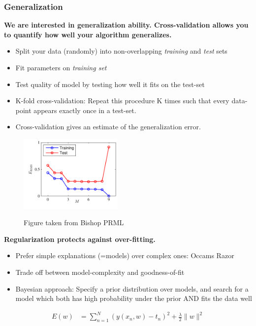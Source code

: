 \subsubsection{Generalization}
\textbf{We are interested in generalization ability. Cross-validation allows you to
quantify how well your algorithm generalizes.}\\
\begin{itemize}
	\item Split your data (randomly) into non-overlapping \textit{training} and \textit{test} sets
    \item Fit parameters on \textit{training set}
    \item Test quality of model by testing how well it fits on the test-set
    \item K-fold cross-validation: Repeat this procedure K times such that every data-point appears exactly once in a test-set.
    \item Cross-validation gives an estimate of the generalization error.
\end{itemize}

\begin{figure}
	\centering
	\includegraphics[width=0.45\textwidth]{./lecture1/Figure1_5}
	
	Figure taken from Bishop PRML
\end{figure}

\textbf{Regularization protects against over-fitting.}\
\begin{itemize}
 \item Prefer simple explanations (=models) over complex ones: Occams Razor
 \item Trade off between model-complexity and goodness-of-fit
 \item Bayesian approach: Specify a prior distribution over models, and search for a model which both has high probability under the prior AND fits the data well
\end{itemize}

\begin{align*}
	E(w) &= \sum_{n=1}^N (y(x_n, w) - t_n)^2 + \frac{\lambda}{2} \|w\|^2
\end{align*}

